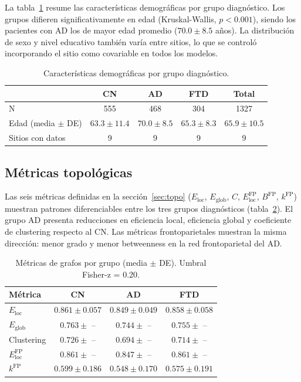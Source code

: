 \documentclass[12pt,a4paper]{article}
\begin{document}
La tabla~\ref{tab:demograficos} resume las características demográficas por grupo diagnóstico. Los grupos difieren significativamente en edad (Kruskal-Wallis, $p < 0.001$), siendo los pacientes con AD los de mayor edad promedio ($70.0 \pm 8.5$ años). La distribución de sexo y nivel educativo también varía entre sitios, lo que se controló incorporando el sitio como covariable en todos los modelos\cite{combat}.

\begin{table}[H]
  \centering
  \caption{Características demográficas por grupo diagnóstico.}
  \label{tab:demograficos}
  \begin{tabular}{lcccc}
    \toprule
    & CN & AD & FTD & Total \\
    \midrule
    N & 555 & 468 & 304 & 1327 \\
    Edad (media $\pm$ DE) & $63.3 \pm 11.4$ & $70.0 \pm 8.5$ & $65.3 \pm 8.3$ & $65.9 \pm 10.5$ \\
    Sitios con datos & 9 & 9 & 9 & 9 \\
    \bottomrule
  \end{tabular}
\end{table}

\subsection{Métricas topológicas}

Las seis métricas definidas en la sección~\ref{sec:topo} ($E_{\text{loc}}$, $E_{\text{glob}}$,
$C$, $E_{\text{loc}}^{\text{FP}}$, $B^{\text{FP}}$, $k^{\text{FP}}$) muestran patrones diferenciables entre los tres grupos diagnósticos (tabla~\ref{tab:grafos}). El grupo AD presenta reducciones en eficiencia local, eficiencia global y coeficiente de clustering respecto al CN\cite{coronel2025}. Las métricas frontoparietales muestran la misma dirección: menor grado y menor betweenness en la red frontoparietal del AD.

\begin{table}[H]
  \centering
  \caption{Métricas de grafos por grupo (media $\pm$ DE). Umbral Fisher-z = 0.20.}
  \label{tab:grafos}
  \begin{tabular}{lccc}
    \toprule
    Métrica & CN & AD & FTD \\
    \midrule
    $E_{\text{loc}}$ & $0.861 \pm 0.057$ & $0.849 \pm 0.049$ & $0.858 \pm 0.058$ \\
    $E_{\text{glob}}$ & $0.763 \pm$ -- & $0.744 \pm$ -- & $0.755 \pm$ -- \\
    Clustering & $0.726 \pm$ -- & $0.694 \pm$ -- & $0.714 \pm$ -- \\
    $E_{\text{loc}}^{\text{FP}}$ & $0.861 \pm$ -- & $0.847 \pm$ -- & $0.861 \pm$ -- \\
    $k^{\text{FP}}$ & $0.599 \pm 0.186$ & $0.548 \pm 0.170$ & $0.575 \pm 0.191$ \\
    \bottomrule
  \end{tabular}
\end{table}
\end{document}
